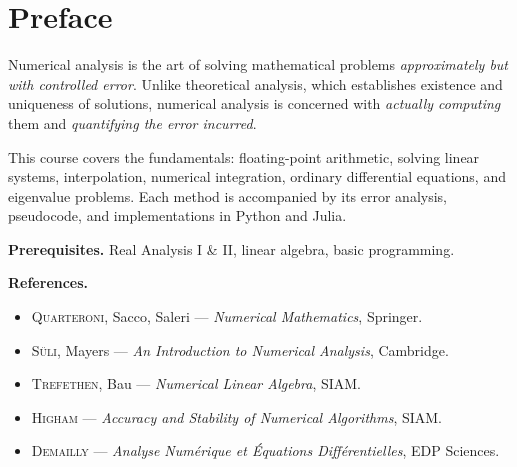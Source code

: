 \documentclass[12pt,a4paper,twoside]{book}
\theoremstyle{definition}
\theoremstyle{plain}
\theoremstyle{remark}
\begin{document}
\frontmatter
\begin{titlepage}
\end{titlepage}
\tableofcontents
\listofalgorithms
{}

\chapter*{Preface}

Numerical analysis is the art of solving mathematical problems \emph{approximately but with controlled error}. Unlike theoretical analysis, which establishes existence and uniqueness of solutions, numerical analysis is concerned with \emph{actually computing} them and \emph{quantifying the error incurred}.

\medskip
This course covers the fundamentals: floating-point arithmetic, solving linear systems, interpolation, numerical integration, ordinary differential equations, and eigenvalue problems. Each method is accompanied by its error analysis, pseudocode, and implementations in Python and Julia.

\medskip
\textbf{Prerequisites.} Real Analysis I \& II, linear algebra, basic programming.

\medskip
\textbf{References.}
\begin{itemize}
\item \textsc{Quarteroni}, Sacco, Saleri --- \emph{Numerical Mathematics}, Springer.
\item \textsc{S\"uli}, Mayers --- \emph{An Introduction to Numerical Analysis}, Cambridge.
\item \textsc{Trefethen}, Bau --- \emph{Numerical Linear Algebra}, SIAM.
\item \textsc{Higham} --- \emph{Accuracy and Stability of Numerical Algorithms}, SIAM.
\item \textsc{Demailly} --- \emph{Analyse Num\'erique et \'Equations Diff\'erentielles}, EDP Sciences.
\end{itemize}
\end{document}
